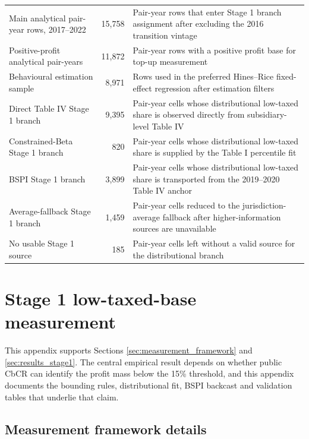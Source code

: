 \documentclass[11pt,a4paper]{article}
\begin{document}
\begin{table}[H]
\begin{tabular}{@{}L{4.5cm}r>{\raggedright\arraybackslash}p{7.8cm}@{}}
Main analytical pair-year rows, 2017--2022 & 15{,}758 & Pair-year rows that enter Stage 1 branch assignment after excluding the 2016 transition vintage \\
Positive-profit analytical pair-years & 11{,}872 & Pair-year rows with a positive profit base for top-up measurement \\
Behavioural estimation sample & 8{,}971 & Rows used in the preferred Hines--Rice fixed-effect regression after estimation filters \\
Direct Table IV Stage 1 branch & 9{,}395 & Pair-year cells whose distributional low-taxed share is observed directly from subsidiary-level Table IV \\
Constrained-Beta Stage 1 branch & 820 & Pair-year cells whose distributional low-taxed share is supplied by the Table I percentile fit \\
BSPI Stage 1 branch & 3{,}899 & Pair-year cells whose distributional low-taxed share is transported from the 2019--2020 Table IV anchor \\
Average-fallback Stage 1 branch & 1{,}459 & Pair-year cells reduced to the jurisdiction-average fallback after higher-information sources are unavailable \\
No usable Stage 1 source & 185 & Pair-year cells left without a valid source for the distributional branch \\
\bottomrule
\end{tabular}
\end{table}



\section{Stage 1 low-taxed-base measurement}\label{app:stage1_measurement}

This appendix supports Sections \ref{sec:measurement_framework} and \ref{sec:results_stage1}. The central empirical result depends on whether public CbCR can identify the profit mass below the 15\% threshold, and this appendix documents the bounding rules, distributional fit, BSPI backcast and validation tables that underlie that claim.

\subsection{Measurement framework details}\label{app:measurement_framework}
\end{document}
